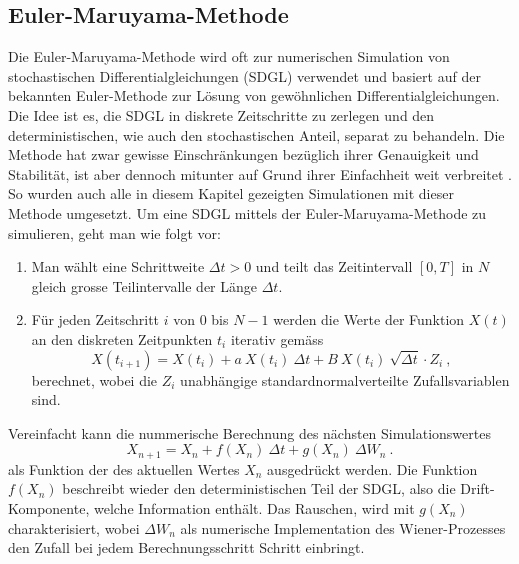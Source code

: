 \subsection{Euler-Maruyama-Methode\label{brown:Simulation}}

Die Euler-Maruyama-Methode wird oft zur numerischen Simulation von stochastischen Differentialgleichungen (SDGL) verwendet und basiert auf der bekannten Euler-Methode zur Lösung von gewöhnlichen Differentialgleichungen. Die Idee ist es, die SDGL in diskrete Zeitschritte zu zerlegen und den deterministischen, wie auch den stochastischen Anteil, separat zu behandeln. Die Methode hat zwar gewisse Einschränkungen bezüglich ihrer Genauigkeit und Stabilität, ist aber dennoch mitunter auf Grund ihrer Einfachheit weit verbreitet \cite{Bayram2018}. So wurden auch alle in diesem Kapitel gezeigten Simulationen mit dieser Methode umgesetzt. Um eine SDGL mittels der Euler-Maruyama-Methode zu simulieren, geht man wie folgt vor:




\begin{enumerate}
	\item Man wählt eine Schrittweite $ \Delta t > 0 $ und teilt das Zeitintervall $ [0, T] $ in $ N $ gleich grosse Teilintervalle der Länge $ \Delta t $.
	\item Für jeden Zeitschritt $ i $ von $ 0 $ bis $ N-1 $ werden die Werte der Funktion $ X(t) $ an den diskreten Zeitpunkten $ t_i $ iterativ gemäss
	\begin{equation}
		X(t_{i+1}) = X(t_i) + a \ X(t_i) \ \Delta t + B \ X(t_i) \ \sqrt{\Delta t} \cdot Z_i \ ,
	\end{equation}
	berechnet, wobei die $ Z_i $ unabhängige standardnormalverteilte Zufallsvariablen sind.
\end{enumerate}

Vereinfacht kann die nummerische Berechnung des nächsten Simulationswertes
\begin{equation}
	X_{n+1} = X_n + f(X_n) \ \Delta t + g(X_n) \ \Delta W_n \ .
\end{equation}
als Funktion der des aktuellen Wertes  $ X_n $ ausgedrückt werden. Die Funktion $ f(X_n) $ beschreibt wieder den deterministischen Teil der SDGL, also die Drift-Komponente, welche Information enthält. Das Rauschen, wird mit $ g(X_n) $ charakterisiert, wobei $ \Delta W_n $ als numerische Implementation des Wiener-Prozesses den Zufall bei jedem Berechnungsschritt Schritt einbringt.



